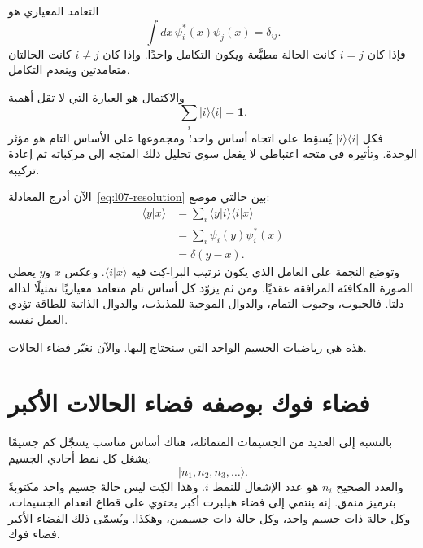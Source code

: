 التعامد المعياري هو
\begin{equation}
\int dx\,\psi_i^*(x)\psi_j(x)=\delta_{ij}.
\label{eq:l07-orthonormality}
\end{equation}
فإذا كان \(i=j\) كانت الحالة مطبَّعة ويكون التكامل واحدًا. وإذا كان \(i\ne j\) كانت الحالتان متعامدتين وينعدم التكامل.

والاكتمال هو العبارة التي لا تقل أهمية
\begin{equation}
\sum_i |i\rangle\langle i|=\mathbf 1.
\label{eq:l07-resolution}
\end{equation}
فكل \(|i\rangle\langle i|\) يُسقِط على اتجاه أساس واحد؛ ومجموعها على الأساس التام هو مؤثر الوحدة. وتأثيره في متجه اعتباطي لا يفعل سوى تحليل ذلك المتجه إلى مركباته ثم إعادة تركيبه.

الآن أدرج المعادلة~\eqref{eq:l07-resolution} بين حالتي موضع:
\begin{align}
\langle y|x\rangle
&=\sum_i\langle y|i\rangle\langle i|x\rangle \\
&=\sum_i\psi_i(y)\psi_i^*(x) \\
&=\delta(y-x).
\label{eq:l07-position-completeness}
\end{align}
وتوضع النجمة على العامل الذي يكون ترتيب البرا-كِت فيه \(\langle i|x\rangle\). وعكس \(x\) و\(y\) يعطي الصورة المكافئة المرافقة عقديًا. ومن ثم يزوّد كل أساس تام متعامد معياريًا تمثيلًا لدالة دلتا. فالجيوب، وجيوب التمام، والدوال الموجية للمذبذب، والدوال الذاتية للطاقة تؤدي العمل نفسه.

\begin{classroomqa}
\end{classroomqa}

هذه هي رياضيات الجسيم الواحد التي سنحتاج إليها. والآن نغيّر فضاء الحالات.

\section{فضاء فوك بوصفه فضاء الحالات الأكبر}

بالنسبة إلى العديد من الجسيمات المتماثلة، هناك أساس مناسب يسجّل كم جسيمًا يشغل كل نمط أحادي الجسيم:
\begin{equation}
|n_1,n_2,n_3,\ldots\rangle.
\label{eq:l07-fock-basis}
\end{equation}
والعدد الصحيح \(n_i\) هو عدد الإشغال للنمط \(i\). وهذا الكِت ليس حالةَ جسيم واحد مكتوبةً بترميز منمق. إنه ينتمي إلى فضاء هيلبرت أكبر يحتوي على قطاع انعدام الجسيمات، وكل حالة ذات جسيم واحد، وكل حالة ذات جسيمين، وهكذا. ويُسمّى ذلك الفضاء الأكبر فضاء فوك.

